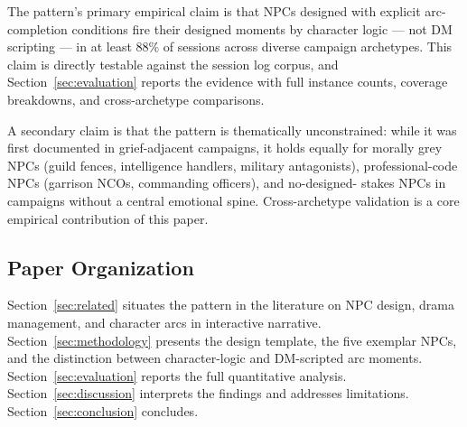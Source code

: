 The pattern's primary empirical claim is that NPCs designed with explicit
arc-completion conditions fire their designed moments by character logic ---
not DM scripting --- in at least 88\% of sessions across diverse campaign
archetypes. This claim is directly testable against the session log corpus,
and Section~\ref{sec:evaluation} reports the evidence with full instance
counts, coverage breakdowns, and cross-archetype comparisons.

A secondary claim is that the pattern is thematically unconstrained: while
it was first documented in grief-adjacent campaigns, it holds equally for
morally grey NPCs (guild fences, intelligence handlers, military antagonists),
professional-code NPCs (garrison NCOs, commanding officers), and no-designed-
stakes NPCs in campaigns without a central emotional spine. Cross-archetype
validation is a core empirical contribution of this paper.

\subsection{Paper Organization}

Section~\ref{sec:related} situates the pattern in the literature on NPC design,
drama management, and character arcs in interactive narrative. Section~\ref{sec:methodology}
presents the design template, the five exemplar NPCs, and the distinction between
character-logic and DM-scripted arc moments. Section~\ref{sec:evaluation} reports
the full quantitative analysis. Section~\ref{sec:discussion} interprets the
findings and addresses limitations. Section~\ref{sec:conclusion} concludes.
